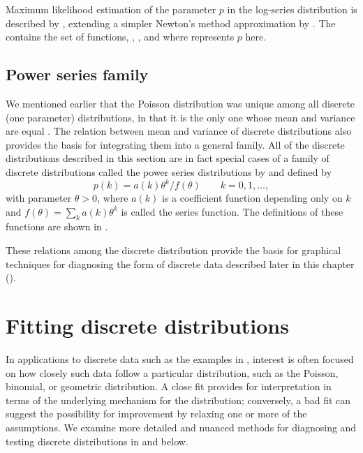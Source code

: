 \documentclass[11pt]{book}
\begin{document}
Maximum likelihood estimation of the parameter $p$ in the log-series
distribution is described by \citet{Bohning:1983}, extending a simpler
Newton's method approximation by \citet{Birch:63}.
The  contains the
set of \R functions, 
,
,
 and
 where  represents $p$ here.





\subsection{Power series family}\label{sec:pwrseries}

We mentioned earlier that the Poisson distribution was unique among all discrete (one parameter) distributions, in that it is the only one whose mean and variance are equal
\citep{Kosambi:49}.
The relation between mean and variance of discrete distributions also provides
the basis for integrating them into a general family.
All of the discrete distributions described in this section are in fact
special cases of a family of discrete distributions
called the power series distributions by
\citet{Noack:50}
and defined by
\begin{equation*}
p(k) = a(k) \theta^k / f(\theta)
\quad\quad k=0, 1, \dots \comma
\end{equation*}
with parameter $\theta > 0$,
where $a(k)$ is a coefficient function depending only on $k$
and $f ( \theta) = \sum_k a(k) \theta^k$ is called the series
function.  The definitions of these functions are shown in
.


These relations among the discrete distribution provide the basis for
graphical techniques for diagnosing the form of discrete data described
later in this chapter ().


\section{Fitting discrete distributions}\label{sec:discrete-fit}

In applications to discrete data such as the examples in
, interest is often focused on how closely such data follow a
particular distribution, such as the Poisson, binomial, or geometric
distribution.  A close fit provides for interpretation in terms
of the underlying mechanism for the distribution;  conversely, a
bad fit can suggest the possibility for improvement by relaxing
one or more of the assumptions. We examine more detailed and
nuanced methods for diagnosing and testing discrete distributions
in  and 
below.
\end{document}

